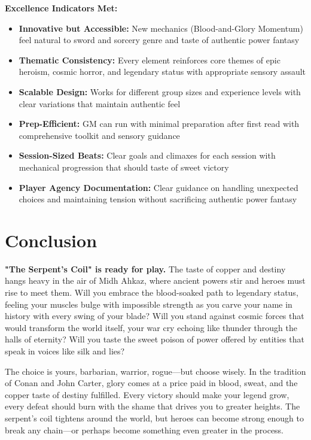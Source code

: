 \documentclass[11pt]{article}
\begin{document}
\begin{itemize}
\textbf{Excellence Indicators Met:}
\begin{itemize}
\item \checkmark \textbf{Innovative but Accessible:} New mechanics (Blood-and-Glory Momentum) feel natural to sword and sorcery genre and taste of authentic power fantasy
\item \checkmark \textbf{Thematic Consistency:} Every element reinforces core themes of epic heroism, cosmic horror, and legendary status with appropriate sensory assault
\item \checkmark \textbf{Scalable Design:} Works for different group sizes and experience levels with clear variations that maintain authentic feel
\item \checkmark \textbf{Prep-Efficient:} GM can run with minimal preparation after first read with comprehensive toolkit and sensory guidance
\item \checkmark \textbf{Session-Sized Beats:} Clear goals and climaxes for each session with mechanical progression that should taste of sweet victory
\item \checkmark \textbf{Player Agency Documentation:} Clear guidance on handling unexpected choices and maintaining tension without sacrificing authentic power fantasy
\end{itemize}

\section*{Conclusion}

\textbf{"The Serpent's Coil" is ready for play.} The taste of copper and destiny hangs heavy in the air of Midh Ahkaz, where ancient powers stir and heroes must rise to meet them. Will you embrace the blood-soaked path to legendary status, feeling your muscles bulge with impossible strength as you carve your name in history with every swing of your blade? Will you stand against cosmic forces that would transform the world itself, your war cry echoing like thunder through the halls of eternity? Will you taste the sweet poison of power offered by entities that speak in voices like silk and lies?

The choice is yours, barbarian, warrior, rogue—but choose wisely. In the tradition of Conan and John Carter, glory comes at a price paid in blood, sweat, and the copper taste of destiny fulfilled. Every victory should make your legend grow, every defeat should burn with the shame that drives you to greater heights. The serpent's coil tightens around the world, but heroes can become strong enough to break any chain—or perhaps become something even greater in the process.


\end{itemize}
\end{document}
